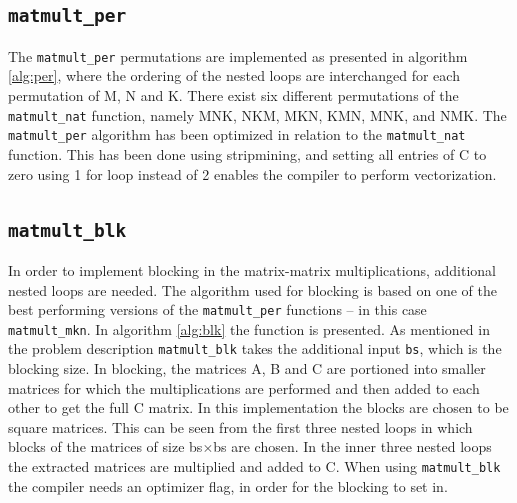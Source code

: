 \subsection{\texttt{matmult\_per}} %
The \texttt{matmult\_per} permutations are implemented as presented in algorithm \ref{alg:per}, where the ordering of the nested loops are interchanged for each permutation of M, N and K. There exist six different permutations of the \texttt{matmult\_nat} function, namely MNK, NKM, MKN, KMN, MNK, and NMK. The \texttt{matmult\_per} algorithm has been optimized in relation to the \texttt{matmult\_nat} function. This has been done using stripmining, and setting all entries of C to zero using 1 for loop instead of 2 enables the compiler to perform vectorization.


\subsection{\texttt{matmult\_blk}} %
In order to implement blocking in the matrix-matrix multiplications, additional nested loops are needed. The algorithm used for blocking is based on one of the best performing versions of the \texttt{matmult\_per} functions – in this case \texttt{matmult\_mkn}. In algorithm \ref{alg:blk} the function is presented. As mentioned in the problem description \texttt{matmult\_blk} takes the additional input \texttt{bs}, which is the blocking size. In blocking, the matrices A, B and C are portioned into smaller matrices for which the multiplications are performed and then added to each other to get the full C matrix. In this implementation the blocks are chosen to be square matrices. This can be seen from the first three nested loops in which blocks of the matrices of size bs$\times$bs are chosen. In the inner three nested loops the extracted matrices are multiplied and added to C. When using \texttt{matmult\_blk} the compiler needs an optimizer flag, in order for the blocking to set in. 






\newpage
